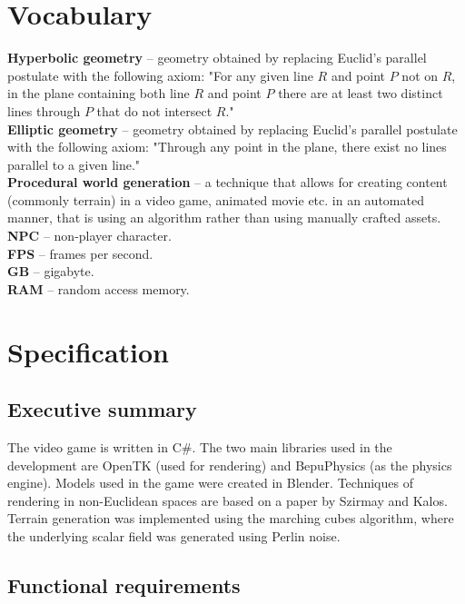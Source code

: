 \documentclass[12pt]{article}
\begin{document}
\section{Vocabulary} %
\textbf{Hyperbolic geometry} -- geometry obtained by replacing Euclid's parallel postulate with the following axiom: "For any given line $R$ and point $P$ not on $R$, in the plane containing both line $R$ and point $P$ there are at least two distinct lines through $P$ that do not intersect $R$." \\
\textbf{Elliptic geometry} -- geometry obtained by replacing Euclid's parallel postulate with the following axiom: "Through any point in the plane, there exist no lines parallel to a given line."\\
\textbf{Procedural world generation} -- a technique that allows for creating content (commonly terrain) in a video game, animated movie etc. in an automated manner, that is using an algorithm rather than using manually crafted assets.\\
\textbf{NPC} -- non-player character.\\
\textbf{FPS} -- frames per second.\\
\textbf{GB} -- gigabyte.\\
\textbf{RAM} -- random access memory.\\


\section{Specification} %

\subsection{Executive summary}

The video game is written in C\#.
The two main libraries used in the development are OpenTK (used for rendering) and BepuPhysics (as the physics engine).
Models used in the game were created in Blender.
Techniques of rendering in non-Euclidean spaces are based on a paper by Szirmay and Kalos.
Terrain generation was implemented using the marching cubes algorithm,
where the underlying scalar field was generated using Perlin noise.

\subsection{Functional requirements}
\end{document}
